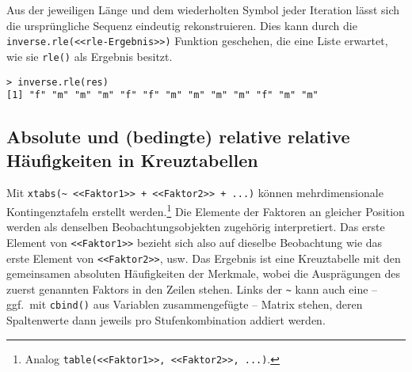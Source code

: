 Aus der jeweiligen Länge und dem wiederholten Symbol jeder Iteration lässt sich die ursprüngliche Sequenz eindeutig rekonstruieren. Dies kann durch die \lstinline!inverse.rle(<<rle-Ergebnis>>)! Funktion geschehen, die eine Liste erwartet, wie sie \lstinline!rle()! als Ergebnis besitzt.
\begin{lstlisting}
> inverse.rle(res)
[1] "f" "m" "m" "m" "f" "f" "m" "m" "m" "m" "f" "m" "m"
\end{lstlisting}

\subsection{Absolute und (bedingte) relative relative Häufigkeiten in Kreuztabellen}
\label{sec:xtabs}

Mit \lstinline!xtabs(~ <<Faktor1>> + <<Faktor2>> + ...)! können mehrdimensionale Kontingenztafeln erstellt werden.\footnote{Analog \lstinline!table(<<Faktor1>>, <<Faktor2>>, ...)!.} Die Elemente der Faktoren an gleicher Position werden als denselben Beobachtungsobjekten zugehörig interpretiert. Das erste Element von \lstinline!<<Faktor1>>! bezieht sich also auf dieselbe Beobachtung wie das erste Element von \lstinline!<<Faktor2>>!, usw. Das Ergebnis ist eine Kreuztabelle mit den gemeinsamen absoluten Häufigkeiten der Merkmale, wobei die Ausprägungen des zuerst genannten Faktors in den Zeilen stehen. Links der \lstinline!~! kann auch eine -- ggf.\ mit \lstinline!cbind()! aus Variablen zusammengefügte -- Matrix stehen, deren Spaltenwerte dann jeweils pro Stufenkombination addiert werden.

